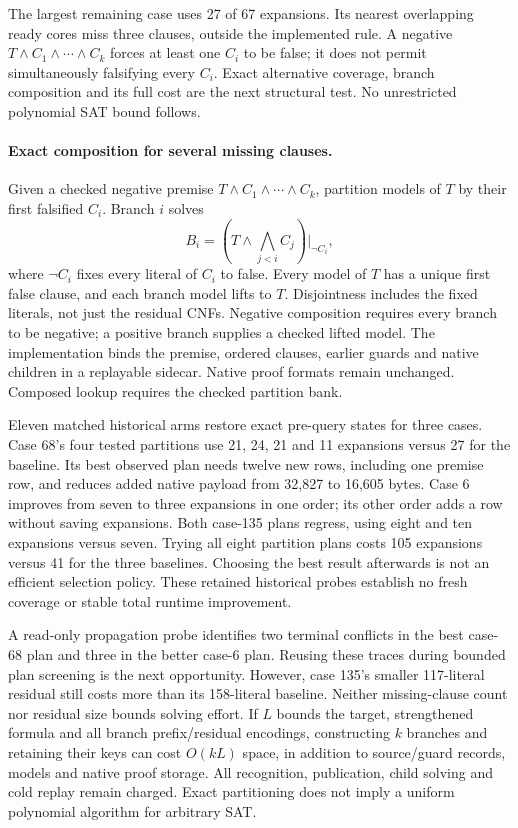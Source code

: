 \documentclass[11pt,a4paper]{article}
\numberwithin{equation}{section}
\theoremstyle{plain}
\theoremstyle{definition}
\theoremstyle{remark}
\begin{document}
The largest remaining case uses 27 of 67 expansions. Its nearest overlapping
ready cores miss three clauses, outside the implemented rule. A negative
$T\wedge C_1\wedge\cdots\wedge C_k$ forces at least one $C_i$ to be false;
it does not permit simultaneously falsifying every $C_i$. Exact alternative
coverage, branch composition and its full cost are the next structural test.
No unrestricted polynomial SAT bound follows.

\paragraph{Exact composition for several missing clauses.}
Given a checked negative premise $T\wedge C_1\wedge\cdots\wedge C_k$, partition
models of $T$ by their first falsified $C_i$. Branch $i$ solves
\[
  B_i=\left(T\wedge\bigwedge_{j<i}C_j\right)\big|_{\neg C_i},
\]
where $\neg C_i$ fixes every literal of $C_i$ to false. Every model of $T$ has a
unique first false clause, and each branch model lifts to $T$. Disjointness
includes the fixed literals, not just the residual CNFs. Negative composition requires every branch to be negative; a positive branch supplies a
checked lifted model. The implementation binds the premise, ordered clauses,
earlier guards and native children in a replayable sidecar. Native proof formats
remain unchanged. Composed lookup requires the checked partition bank.

Eleven matched historical arms restore exact pre-query states for three cases.
Case 68's four tested partitions use 21, 24, 21 and 11 expansions versus 27 for
the baseline. Its best observed plan needs twelve new rows, including one premise
row, and reduces added native payload from 32,827 to 16,605 bytes. Case 6 improves
from seven to three expansions in one order; its other order adds a row without
saving expansions. Both case-135 plans regress, using eight and ten expansions
versus seven. Trying all eight partition plans costs 105 expansions versus 41
for the three baselines. Choosing the best result afterwards is not an efficient
selection policy. These retained historical probes establish no fresh coverage
or stable total runtime improvement.

A read-only propagation probe identifies two terminal conflicts in the best
case-68 plan and three in the better case-6 plan. Reusing these traces during
bounded plan screening is the next opportunity. However, case 135's smaller
117-literal residual still costs more than its 158-literal baseline. Neither
missing-clause count nor residual size bounds solving effort. If $L$ bounds the
target, strengthened formula and all branch prefix/residual encodings, constructing
$k$ branches and retaining their keys can cost $O(kL)$ space, in addition to
source/guard records, models and native proof storage. All recognition,
publication, child solving and cold replay remain charged. Exact partitioning
does not imply a uniform polynomial algorithm for arbitrary SAT.
\end{document}
